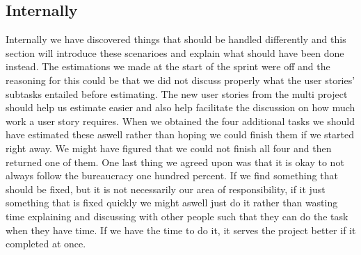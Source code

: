 \subsection{Internally}
Internally we have discovered things that should be handled differently and this section will introduce these scenarioes and explain what should have been done instead.
The estimations we made at the start of the sprint were off and the reasoning for this could be that we did not discuss properly what the user stories' subtasks entailed before estimating.
The new user stories from the multi project should help us estimate easier and also help facilitate the discussion on how much work a user story requires.
When we obtained the four additional tasks we should have estimated these aswell rather than hoping we could finish them if we started right away.
We might have figured that we could not finish all four and then returned one of them.
One last thing we agreed upon was that it is okay to not always follow the bureaucracy one hundred percent. 
If we find something that should be fixed, but it is not necessarily our area of responsibility, if it just something that is fixed quickly we might aswell just do it rather than wasting time explaining and discussing with other people such that they can do the task when they have time.
If we have the time to do it, it serves the project better if it completed at once.
